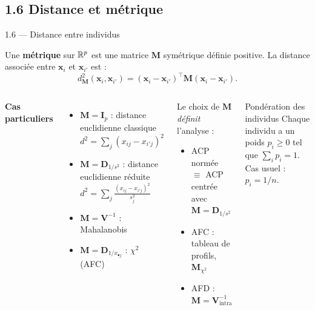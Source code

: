 \subsection{1.6 Distance et métrique}
\begin{frame}{1.6 — Distance entre individus}
\begin{definition}[Métrique]
Une \textbf{métrique} sur $\mathbb{R}^p$ est une matrice $\mathbf{M}$ \alert{symétrique
définie positive}. La distance associée entre $\mathbf{x}_i$ et $\mathbf{x}_{i'}$ est :
\[
d_{\mathbf{M}}^2(\mathbf{x}_i, \mathbf{x}_{i'}) = (\mathbf{x}_i - \mathbf{x}_{i'})^\top \mathbf{M} (\mathbf{x}_i - \mathbf{x}_{i'}).
\]
\end{definition}

\begin{columns}[T]
\textbf{Cas particuliers}
\begin{itemize}\small
  \item $\mathbf{M} = \mathbf{I}_p$ : distance \alert{euclidienne classique}\\
        $d^2 = \sum_j (x_{ij}-x_{i'j})^2$
  \item $\mathbf{M} = \mathbf{D}_{1/s^2}$ : distance \alert{euclidienne réduite}\\
        $d^2 = \sum_j \frac{(x_{ij}-x_{i'j})^2}{s_j^2}$
  \item $\mathbf{M} = \mathbf{V}^{-1}$ : \alert{Mahalanobis}
  \item $\mathbf{M} = \mathbf{D}_{1/x_{\bullet j}}$ : $\chi^2$ (AFC)
\end{itemize}
\begin{prop}
Le choix de $\mathbf{M}$ \emph{définit} l'analyse :
\begin{itemize}\small
  \item ACP normée $\equiv$ ACP centrée avec $\mathbf{M} = \mathbf{D}_{1/s^2}$
  \item AFC : tableau de profils, $\mathbf{M}_{\chi^2}$
  \item AFD : $\mathbf{M} = \mathbf{V}_{\text{intra}}^{-1}$
\end{itemize}
\end{prop}

\begin{block}{Pondération des individus}
\small Chaque individu a un poids $p_i \geq 0$ tel que
$\sum_i p_i = 1$. Cas usuel : $p_i = 1/n$.
\end{block}
\end{columns}
\end{frame}

